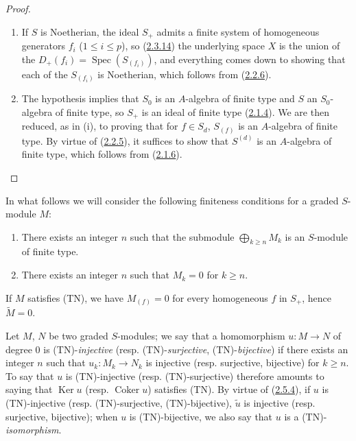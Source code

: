 \begin{proof}
\begin{enumerate}
  \item[\rm(i)] If $S$ is Noetherian, the ideal $S_+$ admits a finite system of
    homogeneous generators $f_i$ ($1\leq i\leq p$), so
    (\hyperref[II.2.3.14]{2.3.14}) the underlying space $X$ is the union of
    the $D_+(f_i)=\operatorname{Spec}(S_{(f_i)})$, and everything comes down to
    showing that each of the $S_{(f_i)}$ is Noetherian, which follows from
    (\hyperref[II.2.2.6]{2.2.6}).
  \item[\rm(ii)] The hypothesis implies that $S_0$ is an $A$-algebra of finite
    type and $S$ an $S_0$-algebra of finite type, so $S_+$ is an ideal of
    finite type (\hyperref[II.2.1.4]{2.1.4}). We are then reduced, as in
    (i), to proving that for $f\in S_d$, $S_{(f)}$ is an $A$-algebra of finite
    type. By virtue of (\hyperref[II.2.2.5]{2.2.5}), it suffices to show
    that $S^{(d)}$ is an $A$-algebra of finite type, which follows from
    (\hyperref[II.2.1.6]{2.1.6}).
\end{enumerate}
\end{proof}

\begin{env}[2.7.2]
\label{II.2.7.2}
In what follows we will consider the following finiteness conditions for
a graded $S$-module $M$:
\begin{enumerate}
  \item[\rm(TF)] There exists an integer $n$ such that the submodule
    $\bigoplus_{k\geq n}M_k$ is an $S$-module of finite type.
  \item[\rm(TN)] There exists an integer $n$ such that $M_k=0$ for $k\geq n$.
\end{enumerate}

If $M$ satisfies (TN), we have $M_{(f)}=0$ for every homogeneous $f$ in $S_+$,
hence $\widetilde{M}=0$.

Let $M$, $N$ be two graded $S$-modules; we say that a homomorphism
$u:M\to N$ of degree $0$ is (TN)-\emph{injective} (resp.
(TN)-\emph{surjective}, (TN)-\emph{bijective}) if there exists an integer $n$
such that $u_k:M_k\to N_k$ is injective (resp. surjective, bijective) for
$k\geq n$. To say that $u$ is (TN)-injective (resp. (TN)-surjective) therefore
amounts to saying that $\operatorname{Ker}u$ (resp. $\operatorname{Coker}u$)
satisfies (TN). By virtue of (\hyperref[II.2.5.4]{2.5.4}), if $u$ is
(TN)-injective (resp. (TN)-surjective, (TN)-bijective), $\widetilde{u}$ is
injective (resp. surjective, bijective); when $u$ is (TN)-bijective, we also
say that $u$ is a (TN)-\emph{isomorphism}.
\end{env}


